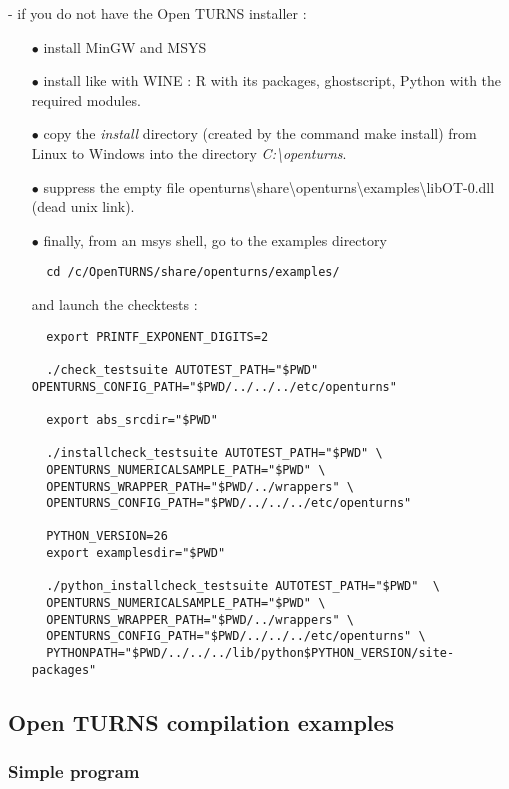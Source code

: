 \documentclass[11pt]{article}
\begin{document}
- if you do not have the Open TURNS installer :

\begin{itemize}
\item[$\bullet$]   install MinGW and MSYS
\item[$\bullet$]   install like with WINE : R with its packages, ghostscript, Python with the required modules.

\item[$\bullet$]   copy the \emph{install} directory (created by the command make install) from Linux to Windows into the directory \emph{C:\textbackslash openturns}.
\item[$\bullet$]   suppress the empty file openturns\textbackslash share\textbackslash openturns\textbackslash examples\textbackslash libOT-0.dll
  (dead unix link).

\item[$\bullet$]   finally, from an msys shell, go to the examples directory

\begin{verbatim}
  cd /c/OpenTURNS/share/openturns/examples/
\end{verbatim}

  and launch the checktests :
\begin{verbatim}
  export PRINTF_EXPONENT_DIGITS=2

  ./check_testsuite AUTOTEST_PATH="$PWD" OPENTURNS_CONFIG_PATH="$PWD/../../../etc/openturns"

  export abs_srcdir="$PWD"

  ./installcheck_testsuite AUTOTEST_PATH="$PWD" \
  OPENTURNS_NUMERICALSAMPLE_PATH="$PWD" \
  OPENTURNS_WRAPPER_PATH="$PWD/../wrappers" \
  OPENTURNS_CONFIG_PATH="$PWD/../../../etc/openturns"

  PYTHON_VERSION=26
  export examplesdir="$PWD"

  ./python_installcheck_testsuite AUTOTEST_PATH="$PWD"  \
  OPENTURNS_NUMERICALSAMPLE_PATH="$PWD" \
  OPENTURNS_WRAPPER_PATH="$PWD/../wrappers" \
  OPENTURNS_CONFIG_PATH="$PWD/../../../etc/openturns" \
  PYTHONPATH="$PWD/../../../lib/python$PYTHON_VERSION/site-packages"
\end{verbatim}
\end{itemize}


\subsection{Open TURNS compilation examples}


\subsubsection{Simple program\label{simple-program}}
\end{document}
